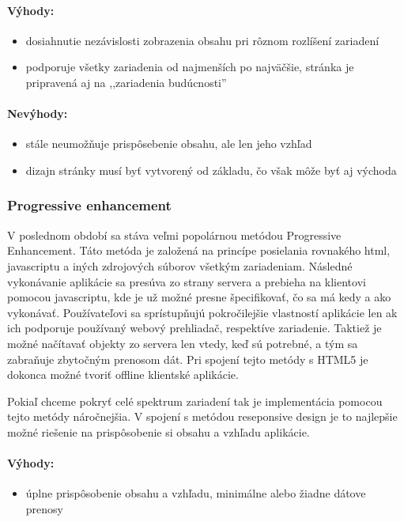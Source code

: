 \paragraph{Výhody:}
\begin{itemize}
	\item dosiahnutie nezávislosti zobrazenia obsahu pri rôznom rozlíšení zariadení
	\item podporuje všetky zariadenia od najmenších po najväčšie, stránka je pripravená aj na ,,zariadenia budúcnosti''
\end{itemize}

\paragraph{Nevýhody:}
\begin{itemize}
	\item stále neumožňuje prispôsebenie obsahu, ale len jeho vzhľad
	\item dizajn stránky musí byť vytvorený od základu, čo však môže byť aj východa
\end{itemize}


\subsubsection{Progressive enhancement} %
\label{ssub:progressive_enhancement}

V poslednom období sa stáva veľmi popolárnou metódou Progressive Enhancement. Táto metóda je založená na princípe posielania rovnakého html, javascriptu a iných zdrojových súborov všetkým zariadeniam. Následné vykonávanie aplikácie sa presúva zo strany servera a prebieha na klientovi pomocou javascriptu, kde je už možné presne špecifikovať, čo sa má kedy a ako vykonávať. Používateľovi sa sprístupňujú pokročilejšie vlastností aplikácie len ak ich podporuje používaný webový prehliadač, respektíve zariadenie. Taktiež je možné načítavať objekty zo servera len vtedy, keď sú potrebné, a tým sa zabraňuje zbytočným prenosom dát. Pri spojení tejto metódy s HTML5 je dokonca možné tvoriť offline klientské aplikácie.

Pokiaľ chceme pokryť celé spektrum zariadení tak je implementácia pomocou tejto metódy náročnejšia. V spojení s metódou reseponsive design je to najlepšie možné riešenie na prispôsobenie si obsahu a vzhľadu aplikácie.

\paragraph{Výhody:}
\begin{itemize}
	\item úplne prispôsobenie obsahu a vzhľadu, minimálne alebo žiadne dátove prenosy
\end{itemize}

